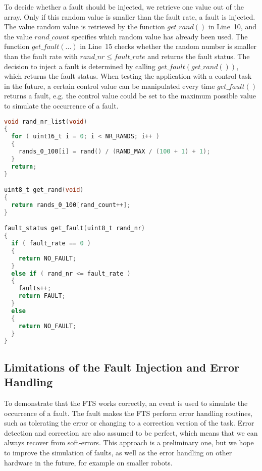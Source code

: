 To decide whether a fault should be injected, we retrieve one value out of the array. Only if this random value is smaller than the fault rate, a fault is injected. The value random value is retrieved by the function $get\_rand()$ in Line~10, and the value $rand\_count$ specifies which random value has already been used. The function $get\_fault(...)$ in Line~15 checks whether the random number is smaller than the fault rate with $rand\_nr \leq fault\_rate$ and returns the fault status. The decision to inject a fault is determined by calling $get\_fault( get\_rand() )$, which returns the fault status. When testing the application with a control task in the future, a certain control value can be manipulated every time $get\_fault()$ returns a fault, e.g. the control value could be set to the maximum possible value to simulate the occurrence of a fault.
\begin{lstlisting}[language=C]
void rand_nr_list(void)
{
  for ( uint16_t i = 0; i < NR_RANDS; i++ )
  {
    rands_0_100[i] = rand() / (RAND_MAX / (100 + 1) + 1);
  }
  return;
} 

uint8_t get_rand(void)
{
  return rands_0_100[rand_count++];
} 

fault_status get_fault(uint8_t rand_nr)
{   
  if ( fault_rate == 0 )
  {
    return NO_FAULT;
  }
  else if ( rand_nr <= fault_rate )
  {
    faults++;
    return FAULT;
  }
  else
  {
    return NO_FAULT;
  }
}
\end{lstlisting}

\subsection{Limitations of the Fault Injection and Error Handling}
To demonstrate that the FTS works correctly, an event is used to simulate the occurrence of a fault. The fault makes the FTS perform error handling routines, such as tolerating the error or changing to a correction version of the task. Error detection and correction are also assumed to be perfect, which means that we can always recover from soft-errors. This approach is a preliminary one, but we hope to improve the simulation of faults, as well as the error handling on other hardware in the future, for example on smaller robots.

